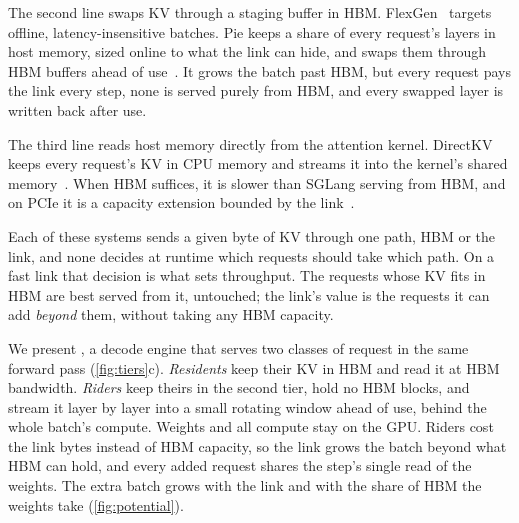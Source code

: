 The second line swaps KV through a staging buffer in HBM.
FlexGen~\cite{flexgen} targets offline, latency-insensitive batches. Pie
keeps a share of every request's layers in host memory, sized online to what
the link can hide, and swaps them through HBM buffers ahead of
use~\cite{pie}. It grows the batch past HBM, but every request pays the link
every step, none is served purely from HBM, and every swapped layer is written
back after use.

The third line reads host memory directly from the attention kernel.
DirectKV keeps every request's KV in CPU memory and streams it into the
kernel's shared memory~\cite{directkv}. When HBM suffices, it is slower than
SGLang serving from HBM, and on PCIe it is a capacity extension bounded by
the link~\cite{directkv}.

Each of these systems sends a given byte of KV through one path, HBM or the
link, and none decides at runtime which requests should take which path. On a
fast link that decision is what sets throughput. The requests whose KV fits in
HBM are best served from it, untouched; the link's value is the requests it
can add \emph{beyond} them, without taking any HBM capacity.

We present \sysname{}, a decode engine that serves two classes of request in
the same forward pass (\cref{fig:tiers}c). \emph{Residents} keep their KV in
HBM and read it at HBM bandwidth. \emph{Riders} keep theirs in the second tier,
hold no HBM blocks, and stream it layer by layer into a small rotating window
ahead of use, behind the whole batch's compute. Weights and all compute stay
on the GPU. Riders cost the link bytes instead of HBM capacity, so the link
grows the batch beyond what HBM can hold, and every added request shares the
step's single read of the weights. The extra batch grows with the link and with
the share of HBM the weights take (\cref{fig:potential}).

